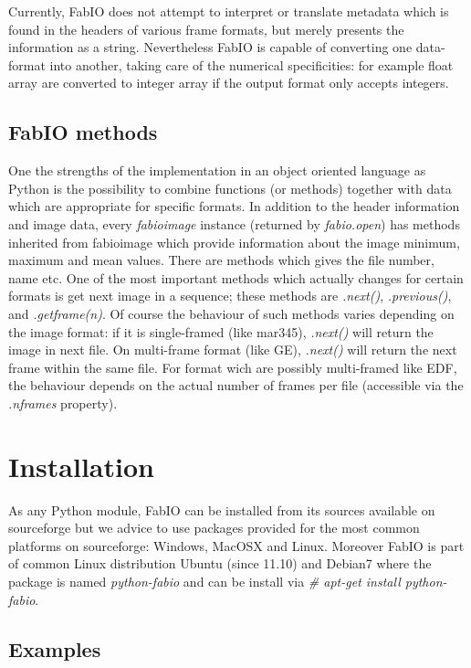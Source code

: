 \documentclass[preprint ]{iucr}
\begin{document}
Currently, FabIO does not attempt to interpret or translate metadata which
is found in the headers of various frame formats, but merely presents the
information as a string. Nevertheless FabIO is capable of converting one
data-format into another, taking care of the numerical specificities: 
for example float array are converted to integer array if the output format only
accepts integers.


\subsection{FabIO methods}

One the strengths of the implementation in an object oriented language as Python
is the possibility to combine functions (or methods) together with data which
are appropriate for specific formats.
In addition to the header information and image data, every {\em fabioimage}
instance (returned by {\em fabio.open}) has methods inherited from fabioimage 
which provide information about the image minimum, maximum and mean values.
There are methods which gives the file number, name etc. One of the most
important methods which actually changes for certain formats  is get next image
in a sequence; these methods are {\em .next()}, {\em .previous()}, and {\em
.getframe(n)}. Of course the behaviour of such methods varies depending on the
image format: if it is single-framed (like mar345),  {\em .next()} will
return the image in next file. On multi-frame format (like GE), {\em .next()} will
return the next frame within the same file. For format wich are possibly multi-framed like
EDF, the behaviour depends on the actual number of frames per file (accessible
via the {\em .nframes} property).


\section{Installation}

As any Python module, FabIO can be installed from its sources available on sourceforge\cite{fabio}
but we advice to use packages provided for the most common
platforms on sourceforge: Windows, MacOSX and Linux. Moreover FabIO is part of
common Linux distribution Ubuntu (since 11.10) and Debian7 where the package is named
{\em python-fabio} and can be install via {\em \# apt-get install python-fabio}.

\subsection{Examples}
\end{document}
